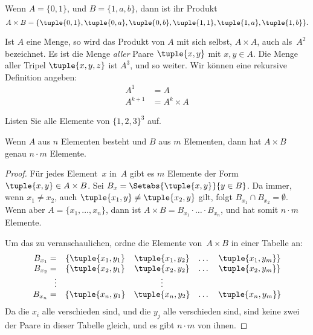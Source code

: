 \documentclass[../../../include/open-logic-section]{subfiles}
\begin{document}
\begin{ex}
Wenn $A = \{0, 1\}$, und $B = \{1, a, b\}$, dann ist ihr Produkt
\[
A \times B = \{ \tuple{0, 1}, \tuple{0, a}, \tuple{0, b},
    \tuple{1, 1}, \tuple{1, a}, \tuple{1, b} \}.
\]
\end{ex}

\begin{ex}
Ist $A$ eine Menge, so wird das Produkt von $A$ mit sich selbst, $A \times A$, auch
als~$A^2$ bezeichnet. Es ist die Menge \emph{aller} Paare $\tuple{x, y}$ mit
$x, y \in A$. Die Menge aller Tripel $\tuple{x, y, z}$ ist $A^3$,
und so weiter. Wir können eine rekursive Definition angeben:
\begin{align*}
  A^1 & = A\\
  A^{k+1} & = A^k \times A
\end{align*}
\end{ex}

\begin{prob}
Listen Sie alle Elemente von $\{1, 2, 3\}^3$ auf.
\end{prob}

\begin{prop}
Wenn $A$ aus $n$ Elementen besteht und $B$ aus $m$ Elementen, dann hat $A
\times B$ genau $n\cdot m$ Elemente.
\end{prop}

\begin{proof}
Für jedes Element~$x$ in~$A$ gibt es $m$ Elemente der
Form $\tuple{x, y} \in A \times B$. Sei $B_x = \Setabs{\tuple{x, y}}{y
  \in B}$. Da immer, wenn $x_1 \neq x_2$, auch $\tuple{x_1, y} \neq
\tuple{x_2, y}$ gilt, folgt $B_{x_1} \cap B_{x_2} = \emptyset$. Wenn aber $A = \{x_1,
\dots, x_n\}$, dann ist $A \times B = B_{x_1} \cdot \dots \cdot B_{x_n}$, und hat somit
$n\cdot m$ Elemente.

Um das zu veranschaulichen, ordne die Elemente von~$A \times B$ in einer Tabelle an:
\[
\begin{array}{rcccc}
  B_{x_1} = & \{\tuple{x_1, y_1} & \tuple{x_1, y_2} & \dots & \tuple{x_1, y_m}\} \\
  B_{x_2} = & \{\tuple{x_2, y_1} & \tuple{x_2, y_2} & \dots & \tuple{x_2, y_m}\} \\
  \vdots & & \vdots\\
  B_{x_n} = & \{\tuple{x_n, y_1} & \tuple{x_n, y_2} & \dots & \tuple{x_n, y_m}\} \\
\end{array}
\]
Da die $x_i$ alle verschieden sind, und die $y_j$ alle verschieden sind, sind keine
zwei der Paare in dieser Tabelle gleich, und es gibt $n\cdot m$
von ihnen.
\end{proof}
\end{document}
